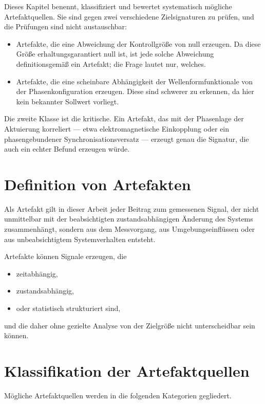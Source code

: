 \documentclass[12pt,a4paper]{report}
\begin{document}
Dieses Kapitel benennt, klassifiziert und bewertet systematisch mögliche
Artefaktquellen. Sie sind gegen zwei verschiedene Zielsignaturen zu
prüfen, und die Prüfungen sind nicht austauschbar:

\begin{itemize}
\item Artefakte, die eine Abweichung der Kontrollgröße von null
      erzeugen. Da diese Größe erhaltungsgarantiert null ist, ist jede
      solche Abweichung definitionsgemäß ein Artefakt; die Frage lautet
      nur, welches.
\item Artefakte, die eine scheinbare Abhängigkeit der
      Wellenformfunktionale von der Phasenkonfiguration erzeugen. Diese
      sind schwerer zu erkennen, da hier kein bekannter Sollwert
      vorliegt.
\end{itemize}

Die zweite Klasse ist die kritische. Ein Artefakt, das mit der
Phasenlage der Aktuierung korreliert --- etwa elektromagnetische
Einkopplung oder ein phasengebundener Synchronisationsversatz ---
erzeugt genau die Signatur, die auch ein echter Befund erzeugen würde.

\section{Definition von Artefakten}

Als Artefakt gilt in dieser Arbeit jeder Beitrag zum gemessenen Signal,
der nicht unmittelbar mit der beabsichtigten zustandsabhängigen
Änderung des Systems zusammenhängt, sondern aus dem Messvorgang, aus
Umgebungseinflüssen oder aus unbeabsichtigtem Systemverhalten entsteht.

Artefakte können Signale erzeugen, die

\begin{itemize}
\item zeitabhängig,
\item zustandsabhängig,
\item oder statistisch strukturiert sind,
\end{itemize}

und die daher ohne gezielte Analyse von der Zielgröße nicht
unterscheidbar sein können.

\section{Klassifikation der Artefaktquellen}

Mögliche Artefaktquellen werden in die folgenden Kategorien gegliedert.
\end{document}
